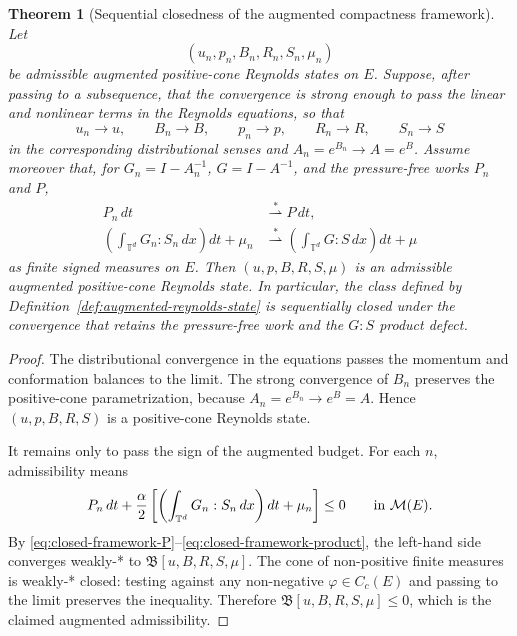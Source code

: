 \documentclass[11pt]{article}
\numberwithin{equation}{section}
\newtheorem{theorem}{Theorem}[section]
\newcommand{\T}{\mathbb T}
\newcommand{\Id}{I}
\begin{document}
\begin{theorem}[Sequential closedness of the augmented compactness framework]
\label{thm:closed-compactness-framework}
Let
\[
  (u_n,p_n,B_n,R_n,S_n,\mu_n)
\]
be admissible augmented positive-cone Reynolds states on \(E\).  Suppose, after
passing to a subsequence, that the convergence is strong enough to pass the
linear and nonlinear terms in the Reynolds equations, so that
\[
  u_n\to u,\qquad B_n\to B,\qquad p_n\to p,\qquad
  R_n\to R,\qquad S_n\to S
\]
in the corresponding distributional senses and \(A_n=e^{B_n}\to A=e^B\).
Assume moreover that, for \(G_n=\Id-A_n^{-1}\), \(G=\Id-A^{-1}\), and the
pressure-free works \(P_n\) and \(P\),
\begin{align}
  P_n\,dt &\stackrel{*}{\rightharpoonup} P\,dt,
  \label{eq:closed-framework-P}\\
  \left(\int_{\T^d}G_n:S_n\,dx\right)dt+\mu_n
  &\stackrel{*}{\rightharpoonup}
  \left(\int_{\T^d}G:S\,dx\right)dt+\mu
  \label{eq:closed-framework-product}
\end{align}
as finite signed measures on \(E\).  Then
\((u,p,B,R,S,\mu)\) is an admissible augmented positive-cone Reynolds state.
In particular, the class defined by
Definition~\ref{def:augmented-reynolds-state} is sequentially closed under the
convergence that retains the pressure-free work and the \(G:S\) product defect.
\end{theorem}

\begin{proof}
The distributional convergence in the equations passes the momentum and
conformation balances to the limit.  The strong convergence of \(B_n\) preserves
the positive-cone parametrization, because \(A_n=e^{B_n}\to e^B=A\).  Hence
\((u,p,B,R,S)\) is a positive-cone Reynolds state.

It remains only to pass the sign of the augmented budget.  For each \(n\),
admissibility means
\[
  P_n\,dt+\frac{\alpha}{2}
  \left[
  \left(\int_{\T^d}G_n:S_n\,dx\right)dt+\mu_n
  \right]\le0
  \qquad\hbox{in }\mathcal M(E).
\]
By \eqref{eq:closed-framework-P}--\eqref{eq:closed-framework-product}, the
left-hand side converges weakly-* to
\(\mathfrak B[u,B,R,S,\mu]\).  The cone of non-positive finite measures is
weakly-* closed: testing against any non-negative \(\varphi\in C_c(E)\) and
passing to the limit preserves the inequality.  Therefore
\(\mathfrak B[u,B,R,S,\mu]\le0\), which is the claimed augmented admissibility.
\end{proof}
\end{document}
